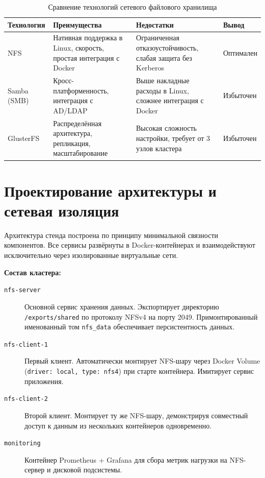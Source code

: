 \documentclass[14pt,a4paper]{extarticle}
\begin{document}
	\begin{table}[h!]
		\centering
		\small
		\begin{tabularx}{\textwidth}{|l|X|X|l|}
			\hline
			\textbf{Технология} & \textbf{Преимущества} & \textbf{Недостатки} & \textbf{Вывод} \\
			\hline
			NFS &
			Нативная поддержка в Linux, скорость, простая интеграция с Docker &
			Ограниченная отказоустойчивость, слабая защита без Kerberos &
			Оптимален \\
			\hline
			Samba (SMB) &
			Кросс-платформенность, интеграция с AD/LDAP &
			Выше накладные расходы в Linux, сложнее интеграция с Docker &
			Избыточен \\
			\hline
			GlusterFS &
			Распределённая архитектура, репликация, масштабирование &
			Высокая сложность настройки, требует от 3 узлов кластера &
			Избыточен \\
			\hline
		\end{tabularx}
		\caption{Сравнение технологий сетевого файлового хранилища}
	\end{table}
	
	\newpage
	
	\section{Проектирование архитектуры и сетевая изоляция}
	
	Архитектура стенда построена по принципу минимальной связности компонентов. Все
	сервисы развёрнуты в Docker-контейнерах и взаимодействуют исключительно через
	изолированные виртуальные сети.
	
	\textbf{Состав кластера:}
	
	\begin{description}
		\item[\texttt{nfs-server}] Основной сервис хранения данных. Экспортирует директорию
		\texttt{/exports/shared} по протоколу NFSv4 на порту 2049. Примонтированный
		именованный том \texttt{nfs\_data} обеспечивает персистентность данных.
		
		\item[\texttt{nfs-client-1}] Первый клиент. Автоматически монтирует NFS-шару через
		Docker Volume (\texttt{driver: local, type: nfs4}) при старте контейнера.
		Имитирует сервис приложения.
		
		\item[\texttt{nfs-client-2}] Второй клиент. Монтирует ту же NFS-шару, демонстрируя
		совместный доступ к данным из нескольких контейнеров одновременно.
		
		\item[\texttt{monitoring}] Контейнер Prometheus + Grafana для сбора метрик нагрузки
		на NFS-сервер и дисковой подсистемы.
	\end{description}
	
\end{document}
